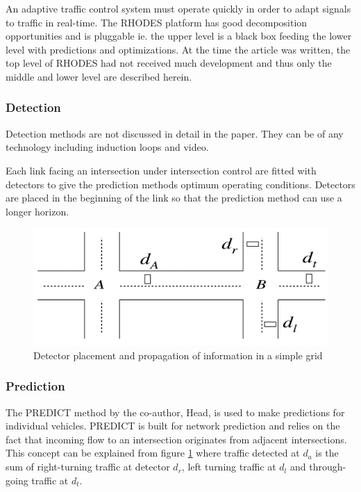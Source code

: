 An adaptive traffic control system must operate quickly in order to adapt signals to traffic in real-time. The RHODES platform has good decomposition opportunities and is pluggable ie. the upper level is a black box feeding the lower level with predictions and optimizations. At the time the article was written, the top level of RHODES had not received much development and thus only the middle and lower level are described herein.

\subsubsection*{Detection}
Detection methods are not discussed in detail in the paper. They can be of any technology including induction loops and video. 

Each link facing an intersection under intersection control are fitted with detectors to give the prediction methods optimum operating conditions. Detectors are placed in the beginning of the link so that the prediction method can use a longer horizon.

\begin{figure}[!ht]
\begin{center}
\includegraphics[scale=0.5]{rhodes_prediction-strategy.png} 
\end{center}
\caption{Detector placement and propagation of information in a simple grid}
\label{fig:rhodes_predict}
\end{figure}

\subsubsection*{Prediction}
The PREDICT method by the co-author, Head, is used to make predictions for individual vehicles. PREDICT is built for network prediction and relies on the fact that incoming flow to an intersection originates from adjacent intersections. This concept can be explained from figure \ref{fig:rhodes_predict} where traffic detected at $d_a$ is the sum of right-turning traffic at detector $d_r$, left turning traffic at $d_l$ and through-going traffic at $d_t$.

